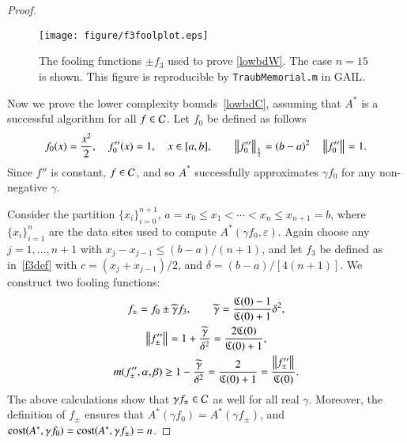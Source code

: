 \documentclass[review]{elsarticle}
\newcommand{\abstol}{\varepsilon}
\theoremstyle{definition}
\newcommand{\tgamma}{\widetilde{\gamma}}
\begin{document}
\begin{proof}
	\begin{figure}
		\centering
		\texttt{[image: figure/f3foolplot.eps]}
		\caption{The fooling functions $\pm f_3$ used to prove \eqref{lowbdW}. The case
		$n=15$ is shown.  This figure is reproducible by \texttt{TraubMemorial.m}
		in GAIL.}
		\label{f3foolplot}
	\end{figure}
	
	Now we prove the lower complexity bounds~\eqref{lowbdC}, assuming that $A^*$ is
	a successful algorithm for all $f \in \mathcal{C}$. Let $f_0$ be defined as follows
	\begin{equation}
	\label{assumpfzero}
	f_0(x) =\frac{x^2}{2}, \quad f_0''(x) = 1, \quad x \in [a,b], \qquad \norm[\frac12]{f_0''} = (b -a)^2  \quad \norm{f_0''} = 1.
	\end{equation}
	Since $f''$ is constant, $f \in \mathcal{C}$, and so $A^*$ successfully approximates
	$\gamma f_0$ for any non-negative $\gamma$.
	
	Consider the partition $\{x_i\}_{i=0}^{n+1}$, $a=x_0 \le x_1 < \cdots < x_n \le
	x_{n+1} = b$, where $\{x_i\}_{i=1}^n$ are the data sites used to compute
	$A^*(\gamma f_0,\abstol)$. Again choose any $j=1, \ldots, n+1$ with $x_j-x_{j-1}
	\le (b-a)/(n+1)$, and let $f_3$ be defined as in~\eqref{f3def} with $c =
	(x_j+x_{j-1})/2$, and $\delta = (b-a)/[4(n+1)]$. We construct two fooling
	functions:
	\begin{gather*}
	f_{\pm} = f_0 \pm \tgamma f_3, \qquad \tgamma =\frac{\fC(0)-1}{\fC(0)+1}\delta^2, \\
	\norm{f''_{\pm}} = 1+\frac{\tgamma}{\delta^2} = \frac{2\fC(0)}{\fC(0)+1} , \\
	m(f''_{\pm},\alpha,\beta) \ge 1-\frac{\tgamma}{\delta^2} = \frac{2}{\fC(0)+1} = \frac{\norm{f''_{\pm}} }{\fC(0)}.
	\end{gather*}
	The above calculations show that $\gamma f_{\pm} \in \mathcal{C}$ as well for all real
	$\gamma$. Moreover, the definition of $f_{\pm}$ ensures that $A^*(\gamma f_0) =
	A^*(\gamma f_{\pm})$, and $\operatorname{cost}(A^*,\gamma f_0) = \operatorname{cost}(A^*,\gamma f_{\pm}) =
	n$.
	

\end{proof}
\end{document}
